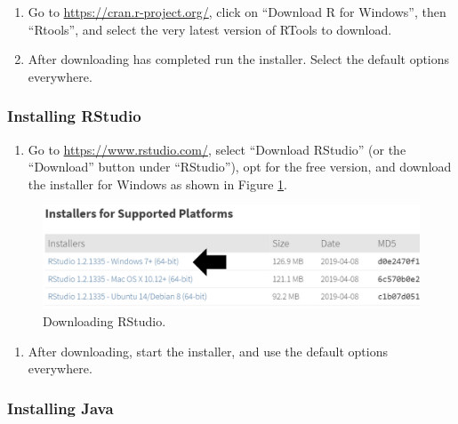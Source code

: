 \documentclass[11pt]{book}
\providecommand{\tightlist}{%
  \setlength{\itemsep}{0pt}\setlength{\parskip}{0pt}}
\theoremstyle{definition}
\theoremstyle{definition}
\theoremstyle{definition}
\theoremstyle{remark}
\begin{document}
\begin{enumerate}
\def\labelenumi{\arabic{enumi}.}
\item
  Go to \url{https://cran.r-project.org/}, click on ``Download R for Windows'', then ``Rtools'', and select the very latest version of RTools to download.
\item
  After downloading has completed run the installer. Select the default options everywhere.
\end{enumerate}

\hypertarget{installing-rstudio}{%
\subsubsection*{Installing RStudio}\label{installing-rstudio}}

\begin{enumerate}
\def\labelenumi{\arabic{enumi}.}
\tightlist
\item
  Go to \url{https://www.rstudio.com/}, select ``Download RStudio'' (or the ``Download'' button under ``RStudio''), opt for the free version, and download the installer for Windows as shown in Figure \ref{fig:downloadRStudio}.
\end{enumerate}

\begin{figure}

{\centering \includegraphics[width=1\linewidth]{images/OhdsiAnalyticsTools/downloadRStudio} 

}

\caption{Downloading RStudio.}\label{fig:downloadRStudio}
\end{figure}

\begin{enumerate}
\def\labelenumi{\arabic{enumi}.}
\setcounter{enumi}{1}
\tightlist
\item
  After downloading, start the installer, and use the default options everywhere.
\end{enumerate}

\hypertarget{installing-java}{%
\subsubsection*{Installing Java}\label{installing-java}}
\end{document}
